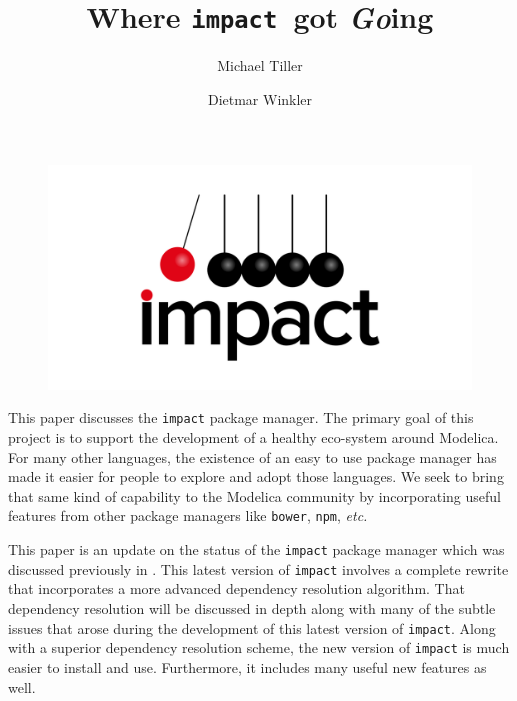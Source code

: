 \documentclass[11pt,a4paper]{article}
\newcommand{\impact}{\texttt{impact}} %
\newcommand{\code}[1]{\texttt{#1}} %
\begin{document}
\thispagestyle{empty}

\title{\textbf{Where \impact\ got \emph{Go}ing}}
\renewcommand\Authfont{\large}        %
\renewcommand\Affilfont{\normalsize}       %
\renewcommand\Authsep{\quad}                     %
\renewcommand\Authand{\quad}                     %
\renewcommand\Authands{\quad}                    %
\author[1]{Michael Tiller}
\author[2]{Dietmar Winkler}

\date{} %
\maketitle\thispagestyle{empty} %


\begin{figure}[!h]
  \centering
  \includegraphics[width=.8\textwidth]{fig/logo}
\end{figure}

This paper discusses the \code{impact} package manager.  The primary
goal of this project is to support the development of a healthy
eco-system around Modelica.  For many other languages, the existence
of an easy to use package manager has made it easier for people to
explore and adopt those languages.  We seek to bring that same kind
of capability to the Modelica community by incorporating useful
features from other package managers like \code{bower}, \code{npm},
\emph{etc.}

This paper is an update on the status of the \code{impact} package
manager which was discussed previously in \parencite{impact1}.  This
latest version of \code{impact} involves a complete rewrite that
incorporates a more advanced dependency resolution algorithm.  That
dependency resolution will be discussed in depth along with many of
the subtle issues that arose during the development of this latest
version of \code{impact}.  Along with a superior dependency resolution
scheme, the new version of \code{impact} is much easier to install
and use.  Furthermore, it includes many useful new features as well.


\small
\printbibliography%
\normalsize
\end{document}
